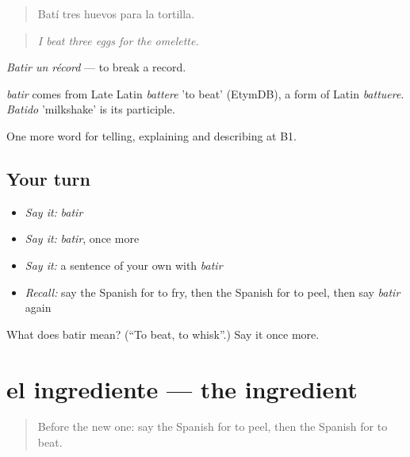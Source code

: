 \begin{quote}
Batí tres huevos para la tortilla.
\end{quote}

\begin{quote}
\emph{I beat three eggs for the omelette.}
\end{quote}

\emph{Batir un récord} — to break a record.

\begin{cousinweb}
\emph{batir} comes from Late Latin \emph{battere} 'to beat' (EtymDB), a form of Latin \emph{battuere}. \emph{Batido} 'milkshake' is its participle.
\end{cousinweb}

\begin{grammarlens}[title={What you've built}]
One more word for telling, explaining and describing at B1.
\end{grammarlens}

\subsection*{Your turn}
\begin{itemize}
\raggedright
  \item \emph{Say it:} \emph{batir}
  \item \emph{Say it:} \emph{batir}, once more
  \item \emph{Say it:} a sentence of your own with \emph{batir}
  \item \emph{Recall:} say the Spanish for to fry, then the Spanish for to peel, then say \emph{batir} again
\end{itemize}

\begin{tcolorbox}[breakable,colback=teal!4,colframe=teal!35!black,title={Before you move on}]
What does batir mean? (\textquotedblleft{}To beat, to whisk\textquotedblright{}.) Say it once more.
\end{tcolorbox}
\section[el ingrediente]{el ingrediente — the ingredient}

\label{lesson:ES-C768-ingrediente}



\begin{quote}
Before the new one: say the Spanish for to peel, then the Spanish for to beat.
\end{quote}

